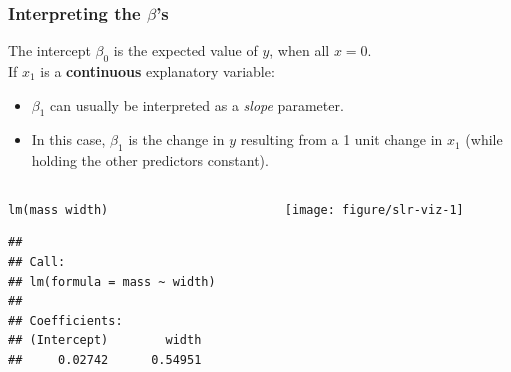\documentclass[color=usenames,dvipsnames]{beamer}\usepackage[]{graphicx}\usepackage[]{color}
\makeatletter
\newcommand{\hlopt}[1]{\textcolor[rgb]{0,0,0}{#1}}%
\newcommand{\hlstd}[1]{\textcolor[rgb]{0,0,0}{#1}}%
\newcommand{\hlkwd}[1]{\textcolor[rgb]{0.004,0.004,0.506}{#1}}%
\newenvironment{kframe}{%
 \def\at@end@of@kframe{}%
 \ifinner\ifhmode%
  \def\at@end@of@kframe{\end{minipage}}%
  \begin{minipage}{\columnwidth}%
 \fi\fi%
 \def\FrameCommand##1{\hskip\@totalleftmargin \hskip-\fboxsep
 \colorbox{shadecolor}{##1}\hskip-\fboxsep
     \hskip-\linewidth \hskip-\@totalleftmargin \hskip\columnwidth}%
 \MakeFramed {\advance\hsize-\width
   \@totalleftmargin\z@ \linewidth\hsize
   \@setminipage}}%
 {\par\unskip\endMakeFramed%
 \at@end@of@kframe}
\newenvironment{knitrout}{}{} %
\makeatother
\begin{document}
\begin{frame}[fragile]
  \frametitle{Interpreting the $\beta$'s}
  \small 
  The intercept $\beta_0$ is the expected value of $y$, when all $x=0$. \\
  \pause
  \vfill
  If $x_1$ is a {\bf continuous} explanatory variable: %
  \begin{itemize}
    \item $\beta_1$ can usually be interpreted as a \textit{slope}
      parameter.
    \item In this case, $\beta_1$ is the
      change in $y$ resulting from a 1 unit change in $x_1$ (while
      holding the other predictors constant).
  \end{itemize}
\pause
\vfill
\centering
\begin{columns}
  \begin{column}{0.5\textwidth}
\begin{knitrout}\tiny
{}\color{fgcolor}\begin{kframe}
\begin{alltt}
\hlkwd{lm}\hlstd{(mass}\hlopt{~}\hlstd{width)}
\end{alltt}
\begin{verbatim}
## 
## Call:
## lm(formula = mass ~ width)
## 
## Coefficients:
## (Intercept)        width  
##     0.02742      0.54951
\end{verbatim}
\end{kframe}
\end{knitrout}
  \end{column}
  \begin{column}{0.4\textwidth}
  \texttt{[image: figure/slr-viz-1]} \\
  \end{column}
\end{columns}
\end{frame}
\end{document}
